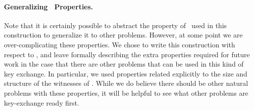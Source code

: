 \paragraph{Generalizing \zkclique~Properties.}
Note that it is certainly possible to abstract the property of \zkclique~used in this construction to generalize it to other problems. However, at some point we are over-complicating these properties. We chose to write this construction with respect to \zkclique, and leave formally describing the extra properties required for future work in the case that there are other problems that can be used in this kind of key exchange. In particular, we used properties related explicitly to the size and structure of the witnesses of \zkclique. While we do believe there should be other natural problems with these properties, it will be helpful to see what other problems are key-exchange ready first.